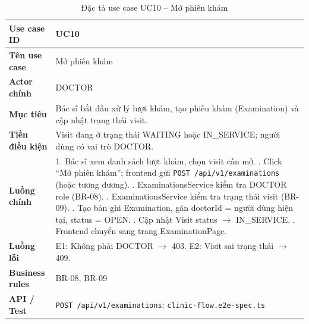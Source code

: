 \begin{table}[H]
\centering
\caption{Đặc tả use case UC10 -- Mở phiên khám}
\label{tab:uc10}
\begin{tabularx}{\textwidth}{|p{3.6cm}|X|}
\hline
\textbf{Use case ID} & UC10 \\
\hline
\textbf{Tên use case} & Mở phiên khám \\
\hline
\textbf{Actor chính} & DOCTOR \\
\hline
\textbf{Mục tiêu} & Bác sĩ bắt đầu xử lý lượt khám, tạo phiếu khám (Examination) và cập nhật trạng thái visit. \\
\hline
\textbf{Tiền điều kiện} & Visit đang ở trạng thái WAITING hoặc IN\_SERVICE; người dùng có vai trò DOCTOR. \\
\hline
\textbf{Luồng chính} &
1. Bác sĩ xem danh sách lượt khám, chọn visit cần mở. \newline
2. Click ``Mở phiên khám''; frontend gửi \texttt{POST /api/v1/examinations} (hoặc tương đương). \newline
3. ExaminationsService kiểm tra DOCTOR role (BR-08). \newline
4. ExaminationsService kiểm tra trạng thái visit (BR-09). \newline
5. Tạo bản ghi Examination, gán doctorId = người dùng hiện tại, status = OPEN. \newline
6. Cập nhật Visit status $\rightarrow$ IN\_SERVICE. \newline
7. Frontend chuyển sang trang ExaminationPage. \\
\hline
\textbf{Luồng lỗi} & E1: Không phải DOCTOR $\rightarrow$ 403. E2: Visit sai trạng thái $\rightarrow$ 409. \\
\hline
\textbf{Business rules} & BR-08, BR-09 \\
\hline
\textbf{API / Test} & \texttt{POST /api/v1/examinations}; \texttt{clinic-flow.e2e-spec.ts} \\
\hline
\end{tabularx}
\end{table}

